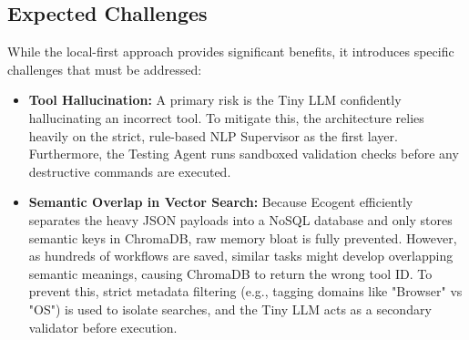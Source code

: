 \subsection{Expected Challenges}
While the local-first approach provides significant benefits, it introduces specific challenges that must be addressed:\\
\begin{itemize}
    \item \textbf{Tool Hallucination:} A primary risk is the Tiny LLM confidently hallucinating an incorrect tool. To mitigate this, the architecture relies heavily on the strict, rule-based NLP Supervisor as the first layer. Furthermore, the Testing Agent runs sandboxed validation checks before any destructive commands are executed.
    \item \textbf{Semantic Overlap in Vector Search:} Because Ecogent efficiently separates the heavy JSON payloads into a NoSQL database and only stores semantic keys in ChromaDB, raw memory bloat is fully prevented. However, as hundreds of workflows are saved, similar tasks might develop overlapping semantic meanings, causing ChromaDB to return the wrong tool ID. To prevent this, strict metadata filtering (e.g., tagging domains like "Browser" vs "OS") is used to isolate searches, and the Tiny LLM acts as a secondary validator before execution.
\end{itemize}

